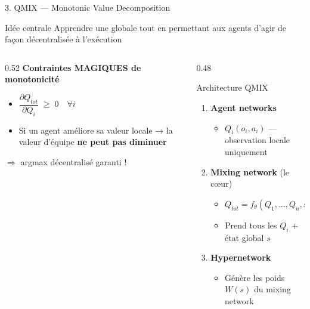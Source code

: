 \documentclass{beamer}
\begin{document}
\begin{frame}{3. QMIX — Monotonic Value Decomposition}

\begin{block}{Idée centrale}
Apprendre une  globale tout en permettant aux agents d'agir de façon \alert{décentralisée} à l'exécution
\end{block}

\vspace{0.4em}

\begin{columns}[T]

\begin{column}{0.52\textwidth}
\textbf{Contraintes MAGIQUES de monotonicité}
\begin{itemize}
    \item $\dfrac{\partial Q_{tot}}{\partial Q_i} \;\geq\; 0 \quad \forall i$
    \item Si un agent améliore sa valeur locale → la valeur d'équipe \textbf{ne peut pas diminuer}
\end{itemize}

\bigskip

$\Rightarrow$ \alert{argmax décentralisé garanti !}

\smallskip
{}
\end{column}

\begin{column}{0.48\textwidth}
\begin{block}{Architecture QMIX}
\begin{enumerate}
    \item \textbf{Agent networks}
    \begin{itemize}
        \item $Q_i(o_i, a_i)$ — observation locale uniquement
    \end{itemize}

    \item \textbf{Mixing network} (le cœur)
    \begin{itemize}
        \item $Q_{tot} = f_\theta(Q_1,\dots,Q_n, s)$
        \item Prend tous les $Q_i$ + état global $s$
    \end{itemize}

    \item \textbf{Hypernetwork}
    \begin{itemize}
        \item Génère les poids $W(s)$ du mixing network
    \end{itemize}
\end{enumerate}
\end{block}
\end{column}


\end{columns}
\end{frame}
\end{document}
